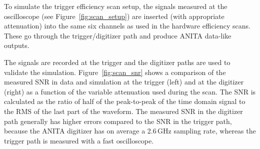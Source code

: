 
To simulate the trigger efficiency scan setup, the signals
measured at the oscilloscope (see Figure~\ref{fig:scan_setup}) 
are inserted (with appropriate attenuation) into the same six channels as used
in the hardware efficiency scans.
These go through the trigger/digitizer path and produce ANITA
data-like outputs.

The signals are recorded at the trigger and the digitizer paths
are used to validate the simulation.
Figure~\ref{fig:scan_snr} shows a comparison of the measured SNR in
data and simulation at the trigger (left) and at
the digitizer (right) as a function of the variable attenuation used
during the scan.
The SNR is calculated as the ratio of half of the peak-to-peak of the
time domain signal to the RMS of the last part of the waveform.
The measured SNR in the digitizer path generally has higher errors compared to the SNR in the trigger path, because the ANITA digitizer has on average a
2.6\,GHz sampling rate, whereas the trigger path is measured with a
fast oscilloscope. 

